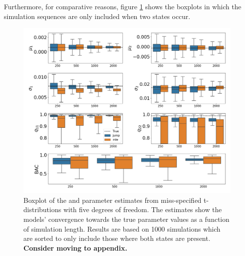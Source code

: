 Furthermore, for comparative reasons, figure \ref{fig:jump_t_box_2states} shows the boxplots in which the simulation sequences are only included when two states occur. 

\begin{figure}[H] 
    \centering
    \includegraphics[width=1\textwidth]{analysis/model_convergence/images/simulation_t_box_2states.png}
    
    
    
    \caption[Boxplot of the \mle and \jump parameter estimates from miss-specified t-distributions with five degrees of freedom. Sorted version]{Boxplot of the \mle and \jump parameter estimates from miss-specified t-distributions with five degrees of freedom. The estimates show the models' convergence towards the true parameter values as a function of simulation length. Results are based on 1000 simulations which are sorted to only include those where both states are present. \textbf{Consider moving to appendix.}} 
    \label{fig:jump_t_box_2states}
\end{figure}

